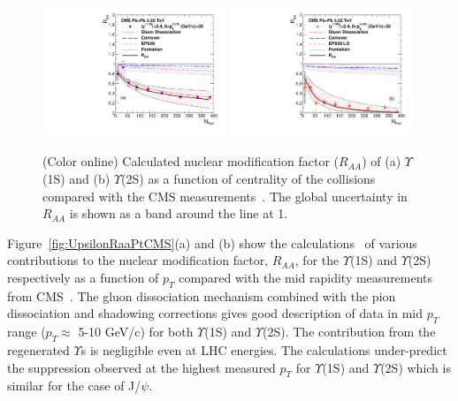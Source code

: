 {\begin{figure}
\includegraphics[width=0.49\textwidth]{Figures/Fig20l_CMS_Y1SRAANPart_Shade.pdf}
\includegraphics[width=0.49\textwidth]{Figures/Fig20r_CMS_Y2SRAANPart_Shade.pdf}
\caption{(Color online) Calculated nuclear modification factor ($R_{AA}$) \cite{Kumar:2019xdj} of 
  (a) $\Upsilon$(1S) and (b) $\Upsilon$(2S) as a function of centrality of the 
  collisions compared with the CMS measurements~\cite{CMS:2018zza}.%
  The global uncertainty in $R_{AA}$ is shown as a band around the line at 1.
}
\label{fig:UpsilonRaaNPartCMS}
\end{figure}


Figure~\ref{fig:UpsilonRaaPtCMS}(a) and (b) show the calculations~\cite{Kumar:2019xdj}
of various contributions to
the nuclear modification factor, $R_{AA}$, for the $\Upsilon$(1S) and $\Upsilon$(2S)
respectively as a function of $p_T$ compared with the mid rapidity measurements from
CMS~\cite{CMS:2018zza}.  
The gluon dissociation mechanism combined with the pion dissociation and shadowing
corrections gives good description of data in mid $p_{T}$ range ($p_{T}\approx$ 5-10 GeV/c)
for both $\Upsilon$(1S) and $\Upsilon$(2S).
The contribution from the regenerated $\Upsilon$s is negligible even at LHC energies.
The calculations under-predict the suppression observed at the highest measured
$p_{T}$ for $\Upsilon$(1S) and $\Upsilon$(2S) which is similar for the case
of J/$\psi$.

}
